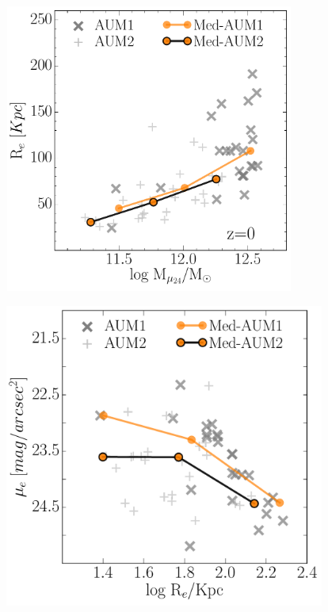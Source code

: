 \begin{figure}[H]
 \centering
 \includegraphics[height=9.5cm, width=10cm]{../al_final/plots/parametros_de_escala/revsm_medians.pdf}
\end{figure}

\begin{figure}[H]
 \centering
 \includegraphics[height=10cm, width=11cm]{../al_final/plots/parametros_de_escala/kormendy.pdf}
\end{figure}
